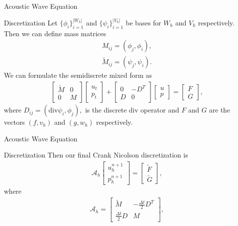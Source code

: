 \documentclass[presentation]{beamer}
\newcommand{\divv}{\mathrm{div}}
\begin{document}
\begin{frame}{Acoustic Wave Equation}
	\begin{block}{Discretization}
		Let $\{\phi_i\}_{i=1}^{|W_h|}$ and $\{\psi_i\}_{i=1}^{|V_h|}$ be bases for $W_h$ and $V_h$ respectively. Then we can define mass matrices  %
		\begin{gather*}
		M_{ij} = (\phi_j,\phi_i), \\
		\tilde{M}_{ij} = (\psi_j,\psi_i).
		\end{gather*}
		We can formulate the semidiscrete mixed form as
		\begin{gather*}
		\begin{bmatrix}
		\tilde{M} & 0\\
		0 & M
		\end{bmatrix} \begin{bmatrix}
		u_t \\
		p_t
		\end{bmatrix} + \begin{bmatrix}
		0 & -D^T \\
		D & 0
		\end{bmatrix} \begin{bmatrix}
		u \\
		p
		\end{bmatrix} = \begin{bmatrix}
		F \\
		G
		\end{bmatrix},
		\end{gather*} %
		where $D_{ij} = (\divv \psi_i, \phi_j),$ is the discrete div operator and $F$ and $G$ are the vectors $(f,v_h)$ and $(g,w_h)$ respectively.
	\end{block}
\end{frame}

\begin{frame}{Acoustic Wave Equation}
	\begin{block}{Discretization}
		Then our final Crank Nicolson discretization is
		\begin{gather*}
		\mathscr{A}_h
		\begin{bmatrix}
		u^{n+1}_h \\
		p^{n+1}_h
		\end{bmatrix}
		=
		\begin{bmatrix}
		\tilde{F}\\
		\tilde{G}
		\end{bmatrix},
		\end{gather*}
		where
		\begin{gather*}
		\mathscr{A}_h = \begin{bmatrix}
		\tilde{M} & -\frac{\Delta t}{2}D^T \\
		\frac{\Delta t}{2}D & M
		\end{bmatrix},
		\end{gather*}
	\end{block}
\end{frame}
\end{document}
